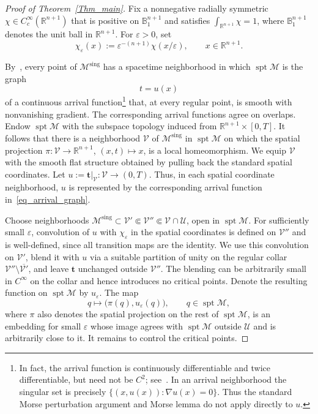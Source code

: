 \documentclass[12pt,twoside,reqno]{amsart}
\newcommand{\IR}{\mathbb{R}}
\newcommand{\IB}{\mathbb{B}}
\newcommand{\UU}{\mathcal{U}}
\newcommand{\VV}{\mathcal{V}}
\newcommand{\MM}{\mathcal{M}}
\newcommand{\eps}{\varepsilon}
\newcommand{\ov}[1]{\overline{#1}}
\DeclareMathOperator{\sing}{sing}
\DeclareMathOperator{\spt}{spt}
\theoremstyle{definition}
\theoremstyle{remark}
\numberwithin{equation}{section}
\begin{document}
\begin{proof}[Proof of Theorem~\ref{Thm_main}]
Fix a nonnegative radially symmetric $\chi\in C_c^\infty(\IR^{n+1})$ that is positive on $\IB^{n+1}_1$ and satisfies $\int_{\IR^{n+1}}\chi=1$, where $\IB^{n+1}_1$ denotes the unit ball in $\IR^{n+1}$.  For $\eps>0$, set
\[
 \chi_\eps(x):=\eps^{-(n+1)}\chi(x/\eps),\qquad x\in\IR^{n+1}.
\]

By~\cite[Theorem~1.11]{BamlerLai}, every point of $\MM^{\sing}$ has a spacetime neighborhood in which $\spt\MM$ is the graph
\[
 t=u(x)
\tag{3.1}\label{eq_arrival_graph}
\]
of a continuous arrival function\footnote{In fact, the arrival function is continuously differentiable and twice differentiable, but need not be $C^2$; see~\cite{ColdingMinicozziDifferentiability,ColdingMinicozziRegularity}. In an arrival neighborhood the singular set is precisely $\{(x,u(x)):\nabla u(x)=0\}$. Thus the standard Morse perturbation argument and Morse lemma do not apply directly to $u$.} that, at every regular point, is smooth with nonvanishing gradient.
The corresponding arrival functions agree on overlaps.
Endow $\spt\MM$ with the subspace topology induced from $\IR^{n+1}\times[0,T]$.
It follows that there is a neighborhood $\VV$ of $\MM^{\sing}$ in $\spt\MM$ on which the spatial projection
$\pi:\VV\to\IR^{n+1}$, $(x,t)\mapsto x$, is a local homeomorphism.
We equip $\VV$ with the smooth flat structure obtained by pulling back the standard spatial coordinates.
Let $u:=\mathbf{t}|_\VV:\VV\to(0,T)$.
Thus, in each spatial coordinate neighborhood, $u$ is represented by the corresponding arrival function in~\eqref{eq_arrival_graph}.

Choose neighborhoods $\MM^{\sing}\subset\VV'\Subset\VV''\Subset\VV\cap\UU$, open in $\spt\MM$.
For sufficiently small $\eps$, convolution of $u$ with $\chi_\eps$ in the spatial coordinates is defined on $\VV''$ and is well-defined, since all transition maps are the identity.
We use this convolution on $\VV'$, blend it with $u$ via a suitable partition of unity on the regular collar $\VV''\setminus\ov{\VV'}$, and leave $\mathbf{t}$ unchanged outside $\VV''$.
The blending can be arbitrarily small in $C^\infty$ on the collar and hence introduces no critical points.
Denote the resulting function on $\spt\MM$ by $u_\eps$.
The map
\[
 q\longmapsto\big(\pi(q),u_\eps(q)\big),\qquad q\in\spt\MM,
\tag{3.2}\label{eq_smoothed_embedding}
\]
where $\pi$ also denotes the spatial projection on the rest of $\spt\MM$,
is an embedding for small $\eps$ whose image agrees with $\spt\MM$ outside $\UU$ and is arbitrarily close to it.
It remains to control the critical points.


\end{proof}
\end{document}
